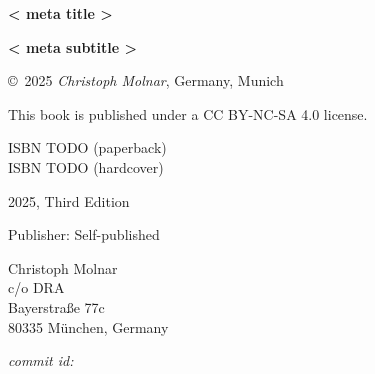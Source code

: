 \thispagestyle{empty}

\newcommand{\authorMail}{science-book@christophmolnar.com}
\newcommand{\authorAddress}{%

Christoph Molnar \\
c/o DRA \\
Bayerstraße 77c \\
80335 München, Germany \\
}
\newcommand{\isbn}{}
\newcommand{\edition}{Third Edition}
\newcommand{\publicationYear}{2025}

\thispagestyle{empty}
\begin{center}
  {
  \bfseries \sffamily \LARGE {{< meta title >}}\par
  \bfseries \small {{< meta subtitle >}}\par
}
\copyright~\publicationYear \textit{ Christoph Molnar}, Germany, Munich\\

\vspace*{\baselineskip}

This book is published under a CC BY-NC-SA 4.0 license.


ISBN TODO (paperback) \\
ISBN TODO (hardcover)

\publicationYear, \edition

\textsc{} 

Publisher: Self-published

\authorAddress

\vspace*{1cm}

\textit{commit id: }

\end{center}

\newpage
\thispagestyle{empty}
\mbox{}
\newpage

